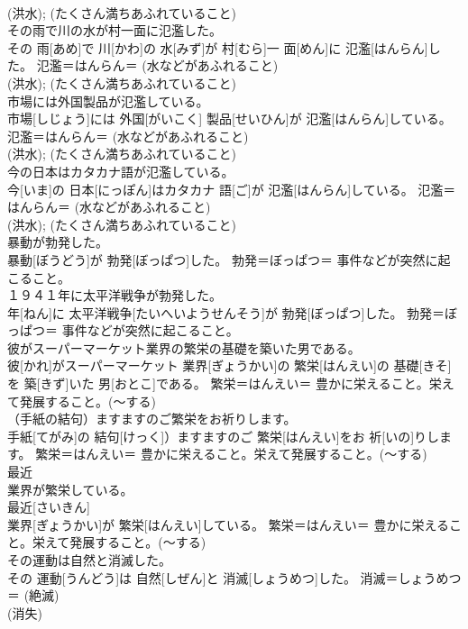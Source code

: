 \documentclass[8pt]{extreport}
\begin{document}
\begin{CJK}{UTF8}{min}
{\\	(洪水); (たくさん満ちあふれていること) 
\\	その雨で川の水が村一面に氾濫した。	
\\	その 雨[あめ]で 川[かわ]の 水[みず]が 村[むら]一 面[めん]に 氾濫[はんらん]した。	氾濫＝はんらん＝ (水などがあふれること) 
\\	(洪水); (たくさん満ちあふれていること) 
\\	市場には外国製品が氾濫している。	
\\	市場[しじょう]には 外国[がいこく] 製品[せいひん]が 氾濫[はんらん]している。	氾濫＝はんらん＝ (水などがあふれること) 
\\	(洪水); (たくさん満ちあふれていること) 
\\	今の日本はカタカナ語が氾濫している。	
\\	今[いま]の 日本[にっぽん]はカタカナ 語[ご]が 氾濫[はんらん]している。	氾濫＝はんらん＝ (水などがあふれること) 
\\	(洪水); (たくさん満ちあふれていること) 
\\	暴動が勃発した。	
\\	暴動[ぼうどう]が 勃発[ぼっぱつ]した。	勃発＝ぼっぱつ＝ 事件などが突然に起こること。
\\	１９４１年に太平洋戦争が勃発した。	
\\	年[ねん]に 太平洋戦争[たいへいようせんそう]が 勃発[ぼっぱつ]した。	勃発＝ぼっぱつ＝ 事件などが突然に起こること。
\\	彼がスーパーマーケット業界の繁栄の基礎を築いた男である。	
\\	彼[かれ]がスーパーマーケット 業界[ぎょうかい]の 繁栄[はんえい]の 基礎[きそ]を 築[きず]いた 男[おとこ]である。	繁栄＝はんえい＝ 豊かに栄えること。栄えて発展すること。(〜する) 
\\	（手紙の結句）ますますのご繁栄をお祈りします。	
\\	手紙[てがみ]の 結句[けっく]）ますますのご 繁栄[はんえい]をお 祈[いの]りします。	繁栄＝はんえい＝ 豊かに栄えること。栄えて発展すること。(〜する) 
\\	最近 
\\	業界が繁栄している。	
\\	最近[さいきん] 
\\	業界[ぎょうかい]が 繁栄[はんえい]している。	繁栄＝はんえい＝ 豊かに栄えること。栄えて発展すること。(〜する) 
\\	その運動は自然と消滅した。	
\\	その 運動[うんどう]は 自然[しぜん]と 消滅[しょうめつ]した。	消滅＝しょうめつ＝ (絶滅) 
\\	(消失) 
}
\end{CJK}
\end{document}
